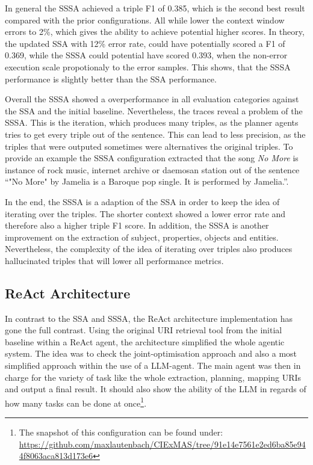 \documentclass[a4paper,oneside,bibliography=totoc]{scrbook}
\begin{document}
In general the \ac{SSSA} achieved a triple F1 of 0.385, which is the second best result compared with the prior configurations. All while lower the context window errors to 2\%, which gives the ability to achieve potential higher scores. In theory, the updated \ac{SSA} with 12\% error rate, could have potentially scored a F1 of 0.369, while the \ac{SSSA} could potential have scored 0.393, when the non-error execution scale propotionaly to the error samples. This shows, that the \ac{SSSA} performance is slightly better than the \ac{SSA} performance.

Overall the \ac{SSSA} showed a overperformance in all evaluation categories against the \ac{SSA} and the initial baseline. Nevertheless, the traces reveal a problem of the \ac{SSSA}. This is the iteration, which produces many triples, as the planner agents tries to get every triple out of the sentence. This can lead to less precision, as the triples that were outputed sometimes were alternatives the original triples. To provide an example the \ac{SSSA} configuration extracted that the song \textit{No More} is instance of rock music, internet archive or daemosan station out of the sentence \enquote{"No More" by Jamelia is a Baroque pop single. It is performed by Jamelia.}.

In the end, the \ac{SSSA} is a adaption of the \ac{SSA} in order to keep the idea of iterating over the triples. The shorter context showed a lower error rate and therefore also a higher triple F1 score. In addition, the \ac{SSSA} is another improvement on the extraction of subject, properties, objects and entities. Nevertheless, the complexity of the idea of iterating over triples also produces hallucinated triples that will lower all performance metrics.

\subsection{ReAct Architecture}
\label{subsec:one_agent_architecture_tool_usage}

In contrast to the \ac{SSA} and \ac{SSSA}, the ReAct architecture implementation has gone the full contrast. Using the original URI retrieval tool from the initial baseline within a ReAct agent, the architecture simplified the whole agentic system. The idea was to check the joint-optimisation approach and also a most simplified approach within the use of a \ac{LLM}-agent. The main agent was then in charge for the variety of task like the whole extraction, planning, mapping URIs and output a final result. It should also show the ability of the \ac{LLM} in regards of how many tasks can be done at once\footnote{The snapshot of this configuration can be found under: \url{https://github.com/maxlautenbach/CIExMAS/tree/91e14e7561e2ed6ba85e944f8063aca813d173e6}}.
\end{document}
